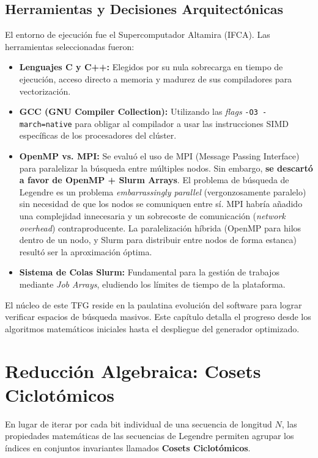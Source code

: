 \documentclass[12pt,a4paper]{tfg_domingo}
\begin{document}
\subsection{Herramientas y Decisiones Arquitectónicas}
El entorno de ejecución fue el Supercomputador Altamira (IFCA). Las herramientas seleccionadas fueron:
\begin{itemize}
    \item \textbf{Lenguajes C y C++:} Elegidos por su nula sobrecarga en tiempo de ejecución, acceso directo a memoria y madurez de sus compiladores para vectorización.
    \item \textbf{GCC (GNU Compiler Collection):} Utilizando las \emph{flags} \texttt{-O3 -march=native} para obligar al compilador a usar las instrucciones SIMD específicas de los procesadores del clúster.
    \item \textbf{OpenMP vs. MPI:} Se evaluó el uso de MPI (Message Passing Interface) para paralelizar la búsqueda entre múltiples nodos. Sin embargo, \textbf{se descartó a favor de OpenMP + Slurm Arrays}. El problema de búsqueda de Legendre es un problema \emph{embarrassingly parallel} (vergonzosamente paralelo) sin necesidad de que los nodos se comuniquen entre sí. MPI habría añadido una complejidad innecesaria y un sobrecoste de comunicación (\emph{network overhead}) contraproducente. La paralelización híbrida (OpenMP para hilos dentro de un nodo, y Slurm para distribuir entre nodos de forma estanca) resultó ser la aproximación óptima.
    \item \textbf{Sistema de Colas Slurm:} Fundamental para la gestión de trabajos mediante \emph{Job Arrays}, eludiendo los límites de tiempo de la plataforma.
\end{itemize}




El núcleo de este TFG reside en la paulatina evolución del software
para lograr verificar espacios de búsqueda masivos. Este capítulo
detalla el progreso desde los algoritmos matemáticos iniciales hasta
el despliegue del generador optimizado. 

\section{Reducción Algebraica: Cosets Ciclotómicos}

En lugar de iterar por cada bit individual de una secuencia de
longitud $N$, las propiedades matemáticas de las secuencias de
Legendre permiten agrupar los índices en conjuntos invariantes
llamados \textbf{Cosets Ciclotómicos}. 
\end{document}
